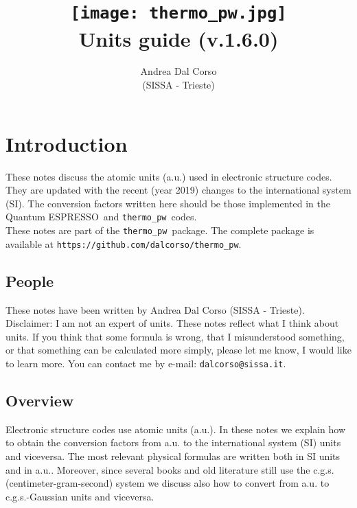 \documentclass[12pt,a4paper,twoside]{report}
\def\version{1.6.0}
\def\qe{{\sc Quantum ESPRESSO}}
\def\tpw{\texttt{thermo\_pw}}
\begin{document}
 

\author{Andrea Dal Corso \\ (SISSA - Trieste)}
\date{}

\title{
  \texttt{[image: thermo\_pw.jpg]} \\
  \vspace{3truecm}
  \Huge \color{dark-blue} Units guide (v.\version)
}

\maketitle

\newpage

\color{dark-blue}
\tableofcontents
\color{black}

\newpage

{\color{dark-blue}\chapter{Introduction}}
\color{black}

These notes discuss the atomic units (a.u.) used in 
electronic structure codes. They are updated with the recent 
(year 2019) changes to the international system (SI).  
The conversion factors written here should be those implemented in
the \qe\ and \tpw\ codes. \\
These notes are part of the \tpw\ package. The complete package is
available at \texttt{https://github.com/dalcorso/thermo\_pw}.

\newpage
{\color{coral}\section{People}}
\color{black}
These notes have been written by Andrea Dal Corso (SISSA - Trieste). \\
Disclaimer: I am not an expert of units. 
These notes reflect what I think about units.
If you think that some formula is wrong, that I misunderstood something, or 
that something can be calculated more simply, please let me know, I would 
like to learn more. 
You can contact me by e-mail: \texttt{dalcorso@sissa.it}. 

\newpage
{\color{coral}\section{Overview}}
\color{black}
Electronic structure codes use atomic units (a.u.). 
In these notes we explain how to obtain the conversion factors 
from a.u. to the international system (SI) units and viceversa. 
The most relevant physical formulas are written both in SI units 
and in a.u.. Moreover, since several books and old literature still 
use the c.g.s. (centimeter-gram-second) system we discuss also how 
to convert from a.u. to c.g.s.-Gaussian units and viceversa.
\end{document}
